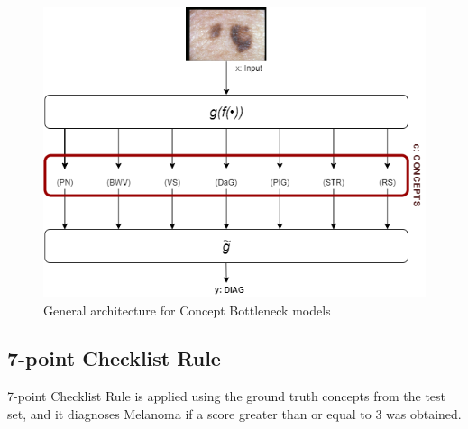 \begin{figure}[]
\centering
  \includegraphics[width=.7\linewidth]{images/model/CBm (1).png}
  \caption{General architecture for Concept Bottleneck models}
  \label{fig:CBMimage}
\end{figure}
\subsection{7-point Checklist Rule}
7-point Checklist Rule is applied using the ground truth concepts from the test set, and it diagnoses Melanoma if a score greater than or equal to 3 was obtained.

